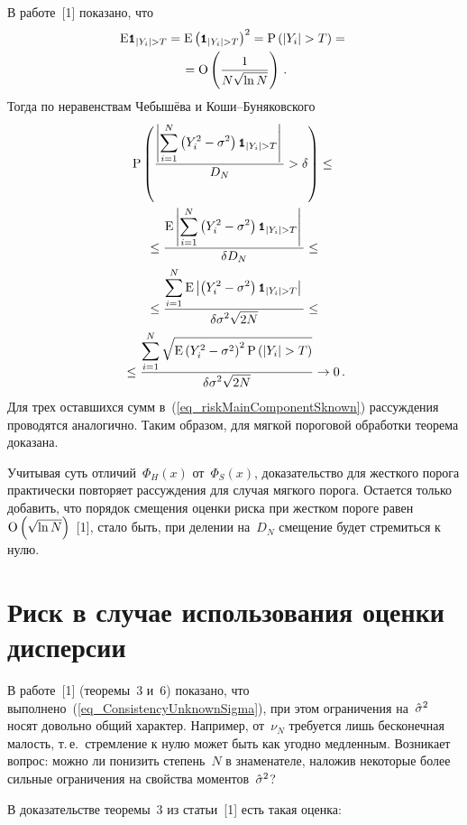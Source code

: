 \begin{multicols}{2}
В работе~[1] показано, что
\begin{multline*}
\expct\indYigT=\expct\left(\indYigT\right)^2=
\prbblty\left(\left|Y_i\right|>T\right)={}\\
{}=\Obig\left(\fr{1}{N\sqrt{\ln N}}\right)\,.
\end{multline*}
Тогда по неравенствам Чебышёва и Коши--Бу\-ня\-ков\-ско\-го
\begin{multline*}
\prbblty\left(\fr{\left|\sum\limits_{i=1}^N\left(Y_i^2-\sigma^2\right)\indYigT\right|}{D_N}>\delta\right) \leq {}\\
{}\leq
\fr{\expct\left|\sum\limits_{i=1}^N\left(Y_i^2-\sigma^2\right)\indYigT\right|}{\delta D_N}\leq{}\\
{}\leq\fr{\sum\limits_{i=1}^N\expct\left|\left(Y_i^2-\sigma^2\right)\indYigT\right|}{\delta\sigma^2\sqrt{2N}}\leq{}\\
{}\leq\fr{\sum\limits_{i=1}^N\sqrt{\expct\left(Y_i^2-\sigma^2\right)^2\prbblty\left(\left|Y_i\right|>T\right)}}{\delta\sigma^2\sqrt{2N}}\rightarrow 0\,.
\end{multline*}
Для трех оставшихся сумм в~(\ref{eq_riskMainComponentSknown}) рассуждения проводятся аналогично. 
Таким образом, для мягкой пороговой обработки теорема доказана.

Учитывая суть отличий~$\Phi_H(x)$ от~$\Phi_S(x)$, доказательство 
для жесткого порога практически повторяет рассуждения для случая 
мягкого порога. Остается только добавить, что порядок смещения 
оценки риска при жестком пороге равен $\textrm{O} \left(\sqrt{\ln N}\right)$~[1], 
стало быть, при делении на~$D_N$ смещение будет стремиться к нулю.

\section{Риск в случае использования оценки дисперсии}
\vspace*{-2pt}

В работе~[1] (теоремы~3 и~6) показано, что выполнено~(\ref{eq_ConsistencyUnknownSigma}), 
при этом ограничения на~$\hat\sigma^2$ носят довольно общий характер. Например, от~$\nu_N$ 
требуется лишь бесконечная малость, т.\,е.\ стремление к нулю может быть как угодно 
медленным. Возникает вопрос: можно ли понизить степень~$N$ в знаменателе, наложив 
некоторые более сильные ограничения на свойства моментов~$\hat\sigma^2$?

В доказательстве теоремы~3 из статьи~[1] есть такая оценка:
\vspace*{-6pt}


\end{multicols}
